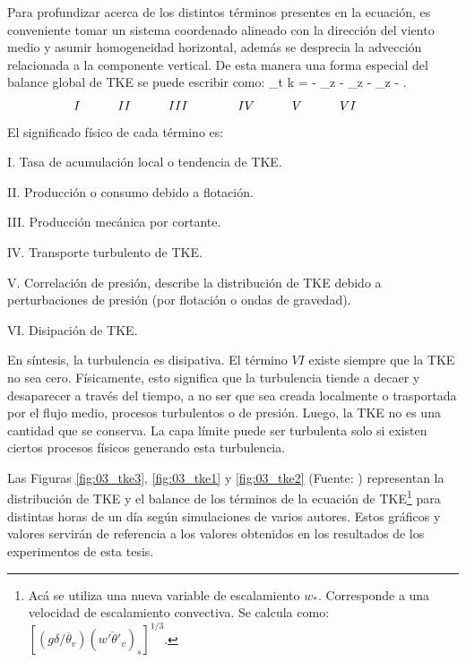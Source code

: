 Para profundizar acerca de los distintos términos presentes en la ecuación, es conveniente tomar un sistema coordenado alineado con la dirección del viento medio y asumir homogeneidad horizontal, además se desprecia la advección relacionada a la componente vertical. De esta manera una forma especial del balance global de TKE se puede escribir como:
\newpage
\be
\partial_t k  =  -  \partial_z  - \partial_z -  \partial_z  - \varepsilon.
\ee
\vspace{-7mm}
\begin{equation*}
 \hspace{-1cm}I \quad\qquad II\quad\qquad III\qquad\qquad IV\quad\qquad V\quad\qquad VI
\end{equation*}
El significado físico de cada término es:
\begin{enumerate*}
	\item[I.] Tasa de acumulación local o tendencia de TKE.
	\item[II.] Producción o consumo debido a flotación.
	\item[III.] Producción mecánica por cortante.
	\item[IV.] Transporte turbulento de TKE.
	\item[V.] Correlación de presión, describe la distribución de TKE debido a perturbaciones de presión (por flotación o ondas de gravedad).
	\item[VI.] Disipación de TKE.
\end{enumerate*}

En síntesis, la turbulencia es disipativa. El término $VI$ existe siempre que la TKE no sea cero. Físicamente, esto significa que la turbulencia tiende a decaer y desaparecer a través del tiempo, a no ser que sea creada localmente o trasportada por el flujo medio, procesos turbulentos o de presión. Luego, la TKE no es una cantidad que se conserva. La capa límite puede ser turbulenta solo si existen ciertos procesos físicos generando esta turbulencia.

Las Figuras \ref{fig:03_tke3}, \ref{fig:03_tke1} y \ref{fig:03_tke2} (Fuente: \cite{stull1988introduction}) representan la distribución de TKE y el balance de los términos de la ecuación de TKE\footnote{Acá se utiliza una nueva variable de escalamiento $w_*$. Corresponde a una velocidad de escalamiento convectiva. Se calcula como: $[(g\delta/\overline{\theta}_v)(\overline{w'\theta'_v})_s]^{1/3}$.} para distintas horas de un día según simulaciones de varios autores. Estos gráficos y valores servirán de referencia a los valores obtenidos en los resultados de los experimentos de esta tesis.

